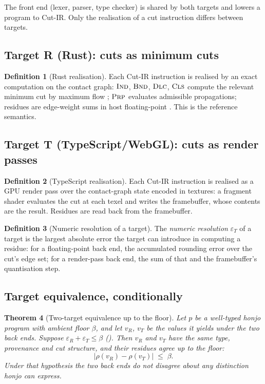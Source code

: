\documentclass[11pt,twocolumn,a4paper]{article}
\theoremstyle{thmstyle}
\newtheorem{theorem}{Theorem}[section]
\theoremstyle{definition}
\newtheorem{definition}[theorem]{Definition}
\theoremstyle{remark}
\newcommand{\flo}{\beta}
\newcommand{\res}{\rho}
\newcommand{\abs}[1]{\lvert#1\rvert}
\newcommand{\eps}{\varepsilon}
\begin{document}
The front end (lexer, parser, type checker) is shared by both targets and
lowers a program to Cut-IR. Only the realisation of a cut instruction
differs between targets.

\subsection{Target R (Rust): cuts as minimum cuts}

\begin{definition}[Rust realisation]
\label{def:rust-target}
Each Cut-IR instruction is realised by an exact computation on the
contact graph: $\textsc{Ind}$, $\textsc{Bnd}$, $\textsc{Dlc}$,
$\textsc{Cls}$ compute the relevant minimum cut by maximum flow
\citep{fordfulkerson1956,stoer1997,cormen2009}; $\textsc{Prp}$ evaluates
admissible propagations; residues are edge-weight sums in host
floating-point \citep{goldberg1991}. This is the reference semantics.
\end{definition}

\subsection{Target T (TypeScript/WebGL): cuts as render passes}

\begin{definition}[TypeScript realisation]
\label{def:ts-target}
Each Cut-IR instruction is realised as a GPU render pass over the
contact-graph state encoded in textures: a fragment shader evaluates the
cut at each texel and writes the framebuffer, whose contents are the
result. Residues are read back from the framebuffer.
\end{definition}

\begin{definition}[Numeric resolution of a target]
\label{def:resolution}
The \emph{numeric resolution} $\eps_T$ of a target is the largest
absolute error the target can introduce in computing a residue: for a
floating-point back end, the accumulated rounding error over the cut's
edge set; for a render-pass back end, the sum of that and the
framebuffer's quantisation step.
\end{definition}

\subsection{Target equivalence, conditionally}

\begin{theorem}[Two-target equivalence up to the floor]
\label{thm:target-equiv}
Let $p$ be a well-typed honjo program with ambient floor $\flo$, and let
$v_R$, $v_T$ be the values it yields under the two back ends.
\emph{Suppose} $\eps_R+\eps_T\le\flo$ (). Then
$v_R$ and $v_T$ have the same type, provenance and cut structure, and
their residues agree up to the floor:
\[
\abs{\res(v_R)-\res(v_T)}\;\le\;\flo .
\]
Under that hypothesis the two back ends do not disagree about any
distinction honjo can express.
\end{theorem}
\end{document}
